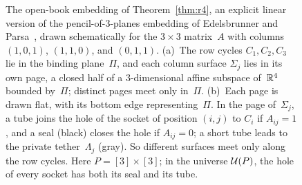 \begin{figure}[t]
\caption{The open-book embedding of Theorem~\ref{thm:r4}, an explicit linear version of the pencil-of-$3$-planes embedding of Edelsbrunner and Parsa~\cite{EP14}, drawn schematically for the $3\times3$ matrix~$A$ with columns $(1,0,1)$, $(1,1,0)$, and $(0,1,1)$.
(a)~The row cycles $C_1,C_2,C_3$ lie in the binding plane~$\Pi$, and each column surface $\Sigma_j$ lies in its own page, a closed half of a $3$-dimensional affine subspace of~$\mathbb{R}^4$ bounded by~$\Pi$; distinct pages meet only in~$\Pi$.
(b)~Each page is drawn flat, with its bottom edge representing~$\Pi$.
In the page of~$\Sigma_j$, a tube joins the hole of the socket of position $(i,j)$ to $C_i$ if $A_{ij}=1$, and a seal (black) closes the hole if $A_{ij}=0$; a short tube leads to the private tether~$\Lambda_j$ (gray).
So different surfaces meet only along the row cycles.
Here $P=[3]\times[3]$; in the universe $\mathcal{U}(P)$, the hole of every socket has both its seal and its tube.}
\label{fig:openbook}
\end{figure}
